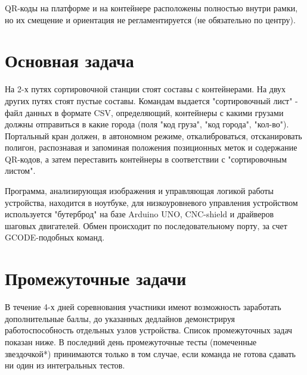QR-коды на платформе и на контейнере расположены полностью внутри рамки, но их смещение и ориентация не регламентируется (не обязательно по центру).

\section{Основная задача}

На 2-х путях сортировочной станции стоят составы с контейнерами.  На двух других путях стоят пустые составы. Командам выдается "сортировочный лист" - файл данных в формате CSV, определяющий, контейнеры с какими грузами должны отправиться в какие города (поля "код груза", "код города", "кол-во").   Портальный кран должен, в автономном режиме, откалиброваться, отсканировать полигон, распознавая и запоминая положения позиционных меток и содержание QR-кодов, а затем переставить контейнеры в соответствии с "сортировочным листом".  

Программа, анализирующая изображения и управляющая логикой работы устройства, находится в ноутбуке,  для низкоуровневого управления устройством используется "бутерброд" на базе  Arduino UNO, CNC-shield и драйверов шаговых двигателей.  Обмен происходит по последовательному порту, за счет GCODE-подобных команд.

\section{Промежуточные задачи} 

В течение 4-х дней соревнования участники имеют возможность заработать дополнительные баллы, до указанных дедлайнов демонстрируя работоспособность отдельных узлов устройства. Список промежуточных задач показан ниже.  В последний день промежуточные тесты (помеченные звездочкой*) принимаются только в том случае, если команда не готова сдавать ни один из интегральных тестов.


